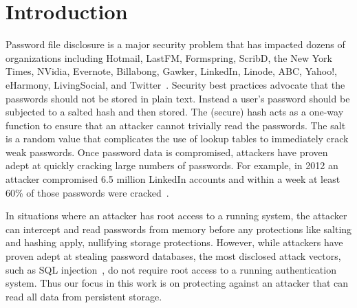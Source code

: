 \section{Introduction}



Password file disclosure is a major security problem that has impacted dozens
of organizations including Hotmail, LastFM, Formspring, ScribD, 
the New York Times, NVidia, Evernote, Billabong, Gawker, LinkedIn, Linode,
ABC, Yahoo!, eHarmony, LivingSocial, and Twitter~\cite{miranteTR13}.
Security best practices advocate that 
the passwords should not be stored in plain text.   Instead a user's password 
should be subjected to a salted hash and then stored.
The (secure) hash acts as a one-way function to ensure that an attacker cannot
trivially read the passwords.   The salt is a random
value that complicates the use of lookup tables to immediately crack weak 
passwords.   
Once password data is compromised, attackers have proven adept at quickly 
cracking large numbers of passwords.    For example, in 2012 an attacker 
compromised
6.5 million LinkedIn accounts and within a week at least 60\% of those
passwords were cracked~\cite{Linkedinpassword}.  


In situations where an attacker has root access to a running system, the
attacker can intercept and read passwords from memory before any 
protections like salting and hashing apply, nullifying storage 
protections.   However, while
attackers have proven adept at stealing password databases, the most 
disclosed attack vectors, such as SQL injection~\cite{passwordresearchblog, 
miranteTR13}, do not require root access to a running authentication system.
Thus our focus in this work is on protecting against an attacker that can
read all data from persistent storage.





